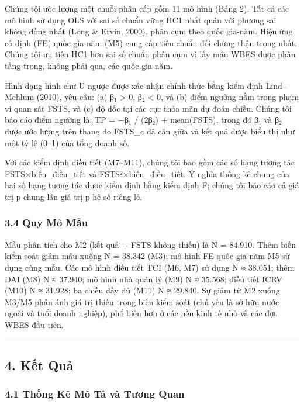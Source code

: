 \documentclass[12pt,a4paper]{article}
\begin{document}
Chúng tôi ước lượng một chuỗi phân cấp gồm 11 mô hình (Bảng 2). Tất cả
các mô hình sử dụng OLS với sai số chuẩn vững HC1 nhất quán với phương
sai không đồng nhất (Long \& Ervin, 2000), phân cụm theo quốc gia-năm.
Hiệu ứng cố định (FE) quốc gia-năm (M5) cung cấp tiêu chuẩn đối chứng
thận trọng nhất. Chúng tôi ưu tiên HC1 hơn sai số chuẩn phân cụm vì lấy
mẫu WBES được phân tầng trong, không phải qua, các quốc gia-năm.

Hình dạng hình chữ U ngược được xác nhận chính thức bằng kiểm định
Lind--Mehlum (2010), yêu cầu: (a) β₁ \textgreater{} 0, β₂ \textless{} 0,
và (b) điểm ngưỡng nằm trong phạm vi quan sát FSTS, và (c) độ dốc tại
các cực thỏa mãn dự đoán chiều. Chúng tôi báo cáo điểm ngưỡng là: TP =
−β₁ / (2β₂) + mean(FSTS), trong đó β₁ và β₂ được ước lượng trên thang đo
FSTS\_c đã căn giữa và kết quả được biểu thị như một tỷ lệ (0--1) của
tổng doanh số.

Với các kiểm định điều tiết (M7--M11), chúng tôi bao gồm các số hạng
tương tác FSTS×biến\_điều\_tiết và FSTS²×biến\_điều\_tiết. Ý nghĩa thống
kê chung của hai số hạng tương tác được kiểm định bằng kiểm định F;
chúng tôi báo cáo cả giá trị p chung lẫn giá trị p hệ số riêng lẻ.

\hypertarget{34-quy-muxf4-mux1eabu}{%
\subsubsection{3.4 Quy Mô Mẫu}\label{34-quy-muxf4-mux1eabu}}

Mẫu phân tích cho M2 (kết quả + FSTS không thiếu) là N = 84.910. Thêm
biến kiểm soát giảm mẫu xuống N = 38.342 (M3); mô hình FE quốc gia-năm
M5 sử dụng cùng mẫu. Các mô hình điều tiết TCI (M6, M7) sử dụng N ≈
38.051; thêm DAI (M8) N ≈ 37.940; mô hình nhà quản lý (M9) N ≈ 35.568;
điều tiết ICRV (M10) N ≈ 31.928; ba chiều đầy đủ (M11) N ≈ 29.840. Sự
giảm từ M2 xuống M3/M5 phản ánh giá trị thiếu trong biến kiểm soát (chủ
yếu là sở hữu nước ngoài và tuổi doanh nghiệp), phổ biến hơn ở các nền
kinh tế nhỏ và các đợt WBES đầu tiên.

\begin{center}\rule{0.5\linewidth}{0.5pt}\end{center}

\hypertarget{4-kux1ebft-quux1ea3}{%
\subsection{4. Kết Quả}\label{4-kux1ebft-quux1ea3}}

\hypertarget{41-thux1ed1ng-kuxea-muxf4-tux1ea3-vuxe0-tux1b0ux1a1ng-quan}{%
\subsubsection{4.1 Thống Kê Mô Tả và Tương
Quan}\label{41-thux1ed1ng-kuxea-muxf4-tux1ea3-vuxe0-tux1b0ux1a1ng-quan}}
\end{document}
